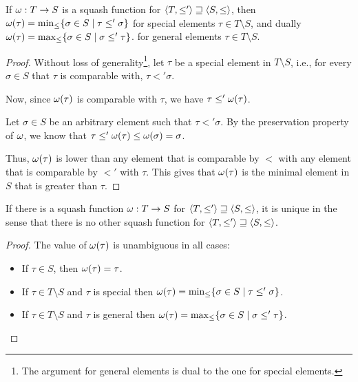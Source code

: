 \documentclass[main.tex]{subfiles}
\begin{document}
\begin{property}\label{prop:squashminmax}
    If $\omega: T \rightarrow S$ is a squash function for
    $\langle  T,  \leq'  \rangle \sqsupseteq \langle  S,  \leq  \rangle$,
    then $\omega(\tau) = \min_{\leq} \{ \sigma \in S \mid \tau \leq' \sigma \}$
    for special elements $\tau \in T \setminus S$, and dually
    $\omega(\tau) = \max_{\leq} \{ \sigma \in S \mid \sigma \leq' \tau \}$.
    for general elements $\tau \in T \setminus S$.
\end{property}
\begin{proof}
    Without loss of generality\footnote{The argument for general elements is dual to the one for special
        elements.},
    let $\tau$ be a special element in $T \setminus S$, i.e., for every
    $\sigma \in S$ that $\tau$ is comparable with, $\tau \less' \sigma$.

    Now, since $\omega(\tau)$ is comparable with $\tau$, we have
    $\tau \leq' \omega(\tau)$.

    Let $\sigma \in S$ be an arbitrary element such that $\tau \less' \sigma$.
    By the preservation property of $\omega$, we know that
    $\tau \leq' \omega(\tau) \leq \omega(\sigma) = \sigma$.

    Thus, $\omega(\tau)$ is lower than any element that is comparable
    by $\less$ with any element that is comparable by $\less'$ with $\tau$.
    This gives that $\omega(\tau)$ is the minimal element in $S$ that is
    greater than $\tau$.
\end{proof}
\begin{corollary}\label{prop:squash:unique}
    If there is a squash function $\omega: T \rightarrow S$ for
    $\langle  T,  \leq'  \rangle \sqsupseteq \langle  S,  \leq  \rangle$,
    it is unique in the sense that there is no other squash function for
    $\langle  T,  \leq'  \rangle \sqsupseteq \langle  S,  \leq  \rangle$.
\end{corollary}
\begin{proof}
    The value of $\omega(\tau)$ is unambiguous in all cases:
    \begin{itemize}
        \item If $\tau \in S$, then $\omega(\tau) = \tau$.
        \item If $\tau \in T \setminus S$ and $\tau$ is special
            then $\omega(\tau) = \min_{\leq} \{ \sigma \in S \mid \tau \leq' \sigma \}$.
        \item If $\tau \in T \setminus S$ and $\tau$ is general
            then $\omega(\tau) = \max_{\leq} \{ \sigma \in S \mid \sigma \leq' \tau \}$.
    \end{itemize}
\end{proof}
\end{document}
